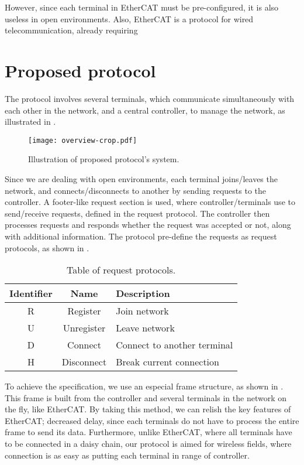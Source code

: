 ﻿\documentclass[twocolumn,9pt]{ltjsarticle}
\renewcommand{\ref}{\Cref}
\begin{document}
However, since each terminal in EtherCAT must be pre-configured, it is also useless in open environments.
Also, EtherCAT is a protocol for wired telecommunication, already requiring 

\section{Proposed protocol}
The protocol involves several terminals, which communicate simultaneously with each other in the network, and a central controller, to manage the network, as illustrated in \ref{fig:overview}.

\begin{figure}[tb]
  \centering
  \texttt{[image: overview-crop.pdf]}
  \caption{\label{fig:overview}
    Illustration of proposed protocol's system.
  }
\end{figure}

Since we are dealing with open environments, each terminal joins/leaves the network, and connects/disconnects to another by sending requests to the controller.
A footer-like request section is used, where controller/terminals use to send/receive requests, defined in the request protocol.
The controller then processes requests and responds whether the request was accepted or not, along with additional information.
The protocol pre-define the requests as request protocols, as shown in \ref{tab:request}.

\begin{table}[tb]
  \centering
  \caption{\label{tab:request}
    Table of request protocols.
  }
  \begin{tabularx}{\linewidth}{ccl}
    \hline
    Identifier & Name & Description\\
    \hline \hline
    R & Register & Join network\\
    U & Unregister & Leave network\\
    D & Connect & Connect to another terminal\\
    H & Disconnect & Break current connection\\
    \hline
  \end{tabularx}
\end{table}

To achieve the specification, we use an especial frame structure, as shown in \ref{fig:frame}.
This frame is built from the controller and several terminals in the network on the fly, like EtherCAT.
By taking this method, we can relish the key features of EtherCAT; decreased delay, since each terminals do not have to process the entire frame to send its data.
Furthermore, unlike EtherCAT, where all terminals have to be connected in a daisy chain, our protocol is aimed for wireless fields, where connection is as easy as putting each terminal in range of controller.
\end{document}
